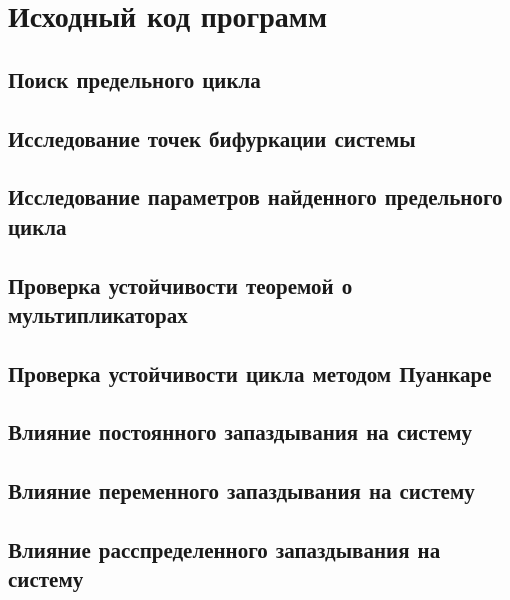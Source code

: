 \chapter{Исходный код программ}
\label{appendix:src}

\section{Поиск предельного цикла}

\clearpage

\section{Исследование точек бифуркации системы}

\clearpage

\section{Исследование параметров найденного предельного цикла}

\clearpage

\section{Проверка устойчивости теоремой о мультипликаторах}

\clearpage

\section{Проверка устойчивости цикла методом Пуанкаре}

\clearpage

\section{Влияние постоянного запаздывания на систему}

\clearpage

\section{Влияние переменного запаздывания на систему}

\clearpage

\section{Влияние расспределенного запаздывания на систему}

\clearpage

